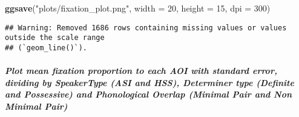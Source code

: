 \documentclass[
]{article}
\newenvironment{Shaded}{\begin{snugshade}}{\end{snugshade}}
\newcommand{\AttributeTok}[1]{\textcolor[rgb]{0.13,0.29,0.53}{#1}}
\newcommand{\DecValTok}[1]{\textcolor[rgb]{0.00,0.00,0.81}{#1}}
\newcommand{\FunctionTok}[1]{\textcolor[rgb]{0.13,0.29,0.53}{\textbf{#1}}}
\newcommand{\NormalTok}[1]{#1}
\newcommand{\StringTok}[1]{\textcolor[rgb]{0.31,0.60,0.02}{#1}}
\begin{document}
\begin{Shaded}
\begin{Highlighting}[]
\FunctionTok{ggsave}\NormalTok{(}\StringTok{"plots/fixation\_plot.png"}\NormalTok{, }\AttributeTok{width =} \DecValTok{20}\NormalTok{, }\AttributeTok{height =} \DecValTok{15}\NormalTok{, }\AttributeTok{dpi =} \DecValTok{300}\NormalTok{)}
\end{Highlighting}
\end{Shaded}

\begin{verbatim}
## Warning: Removed 1686 rows containing missing values or values outside the scale range
## (`geom_line()`).
\end{verbatim}

\subparagraph{Plot mean fixation proportion to each AOI with standard
error, dividing by SpeakerType (ASI and HSS), Determiner type (Definite
and Possessive) and Phonological Overlap (Minimal Pair and Non Minimal
Pair)}\label{plot-mean-fixation-proportion-to-each-aoi-with-standard-error-dividing-by-speakertype-asi-and-hss-determiner-type-definite-and-possessive-and-phonological-overlap-minimal-pair-and-non-minimal-pair}
\end{document}
